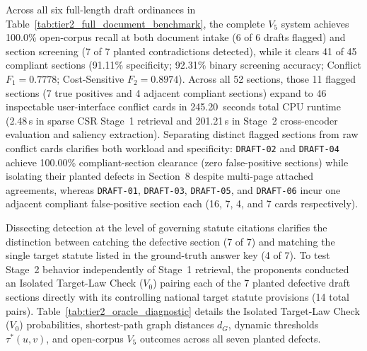 Across all six full-length draft ordinances in Table~\ref{tab:tier2_full_document_benchmark}, the complete $V_5$ system achieves 100.0\% open-corpus recall at both document intake (6 of 6 drafts flagged) and section screening (7 of 7 planted contradictions detected), while it clears 41 of 45 compliant sections (91.11\% specificity; 92.31\% binary screening accuracy; Conflict $F_1 = 0.7778$; Cost-Sensitive $F_2 = 0.8974$). Across all 52 sections, those 11 flagged sections (7 true positives and 4 adjacent compliant sections) expand to 46 inspectable user-interface conflict cards in 245.20~seconds total CPU runtime (2.48\,s in sparse CSR Stage~1 retrieval and 201.21\,s in Stage~2 cross-encoder evaluation and saliency extraction). Separating distinct flagged sections from raw conflict cards clarifies both workload and specificity: \texttt{DRAFT-02} and \texttt{DRAFT-04} achieve 100.00\% compliant-section clearance (zero false-positive sections) while isolating their planted defects in Section~8 despite multi-page attached agreements, whereas \texttt{DRAFT-01}, \texttt{DRAFT-03}, \texttt{DRAFT-05}, and \texttt{DRAFT-06} incur one adjacent compliant false-positive section each (16, 7, 4, and 7 cards respectively).

Dissecting detection at the level of governing statute citations clarifies the distinction between catching the defective section (7 of 7) and matching the single target statute listed in the ground-truth answer key (4 of 7). To test Stage~2 behavior independently of Stage~1 retrieval, the proponents conducted an Isolated Target-Law Check ($V_0$) pairing each of the 7 planted defective draft sections directly with its controlling national target statute provisions (14 total pairs). Table~\ref{tab:tier2_oracle_diagnostic} details the Isolated Target-Law Check ($V_0$) probabilities, shortest-path graph distances $d_G$, dynamic thresholds $\tau^*(u, v)$, and open-corpus $V_5$ outcomes across all seven planted defects.


